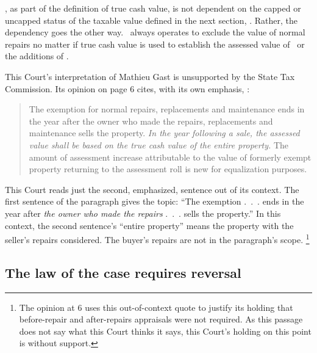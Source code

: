 \documentclass[12pt,\documentclassflag]{michiganCourtOfAppealsBrief}
\begin{document}

\mathieuGast, as part of the definition of true cash value, is not dependent on the capped or uncapped status of the taxable value defined in the next section, \cite{MCL 211.27a}. Rather, the dependency goes the other way. \mathieuGast\ always
operates to exclude the value of normal repairs no matter if true cash value is used to establish the assessed value of \cite{MCL 211.27a(1)}\ or the additions of \cite{MCL 211.27a(2)(b)}.

This Court's interpretation of Mathieu Gast is unsupported by the State Tax Commission. Its opinion on page 6 cites, with its own emphasis, :

\begin{quote}
The exemption for normal repairs, replacements and maintenance ends in the year after the
owner who made the repairs, replacements and maintenance sells the property. \emph{In the year
following a sale, the assessed value shall be based on the true cash value of the entire property.}
The amount of assessment increase attributable to the value of formerly exempt property
returning to the assessment roll is new for equalization purposes.
\end{quote}

This Court reads just the second, emphasized, sentence out of its context. The first sentence of the paragraph gives the topic: ``The exemption .~.~. ends in the year after \emph{the owner who made the repairs} .~.~. sells the property.'' In this context, the second sentence's ``entire property'' means the property with the seller's repairs considered.
The buyer's repairs are not in the paragraph's scope.%
\footnote{The opinion at 6 uses this out-of-context quote to justify its holding that before-repair and after-repairs appraisals were not required. As this passage does not say what this Court thinks it says, this Court's holding on this point is without support.}

\subsection{The law of the case requires reversal}
\end{document}
